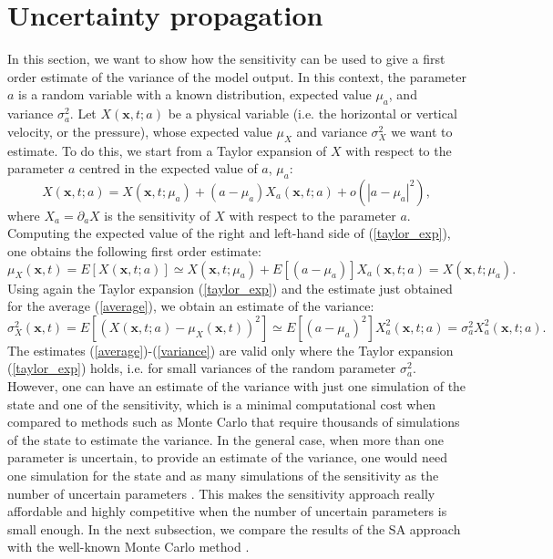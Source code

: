 \chapter{Uncertainty propagation}
\label{sec_uq}
In this section, we want to show how the sensitivity can be used to give a first order estimate of the variance of the model output. In this context, the parameter $a$ is a random variable with a known distribution, expected value $\mu_a$, and variance $\sigma_a^2$. Let $X(\mathbf{x},t;a)$ be a physical variable (i.e. the horizontal or vertical velocity, or the pressure), whose expected value $\mu_X$ and variance $\sigma_X^2$ we want to estimate. To do this, we start from a Taylor expansion of $X$ with respect to the parameter  $a$ centred in the expected value of $a$, $\mu_a$:
\begin{equation}
X(\mathbf{x},t;a) = X(\mathbf{x},t;\mu_a) + (a-\mu_a)X_a(\mathbf{x},t;a) + o(|a-\mu_a|^2),
\label{taylor_exp}
\end{equation}
where $X_a = \partial_a X$ is the sensitivity of $X$ with respect to the parameter $a$. Computing the expected value of the right and left-hand side of (\ref{taylor_exp}), one obtains the following first order estimate:
\begin{equation}
\mu_X(\mathbf{x},t) = E[X(\mathbf{x},t;a)] \simeq X(\mathbf{x},t;\mu_a) + E[(a-\mu_a)]X_a(\mathbf{x},t;a) = X(\mathbf{x},t;\mu_a).
\label{average}
\end{equation}
Using again the Taylor expansion (\ref{taylor_exp}) and the estimate just obtained for the average (\ref{average}), we obtain an estimate of the variance:
\begin{equation}
\sigma_X^2(\mathbf{x},t) = E[(X(\mathbf{x},t;a)-\mu_X(\mathbf{x},t))^2] \simeq E[(a-\mu_a)^2]X_a^2(\mathbf{x},t;a) = \sigma_a^2 X_a^2(\mathbf{x},t;a).
\label{variance}
\end{equation}
The estimates (\ref{average})-(\ref{variance}) are valid only where the Taylor expansion (\ref{taylor_exp}) holds, i.e. for small variances of the random parameter $\sigma_a^2$. However, one can have an estimate of the variance with just one simulation of the state and one of the sensitivity, which is a minimal computational cost when compared to methods such as Monte Carlo that require thousands of simulations of the state to estimate the variance. In the general case, when more than one parameter is uncertain, to provide an estimate of the variance, one would need one simulation for the state and as many simulations of the sensitivity as the number of uncertain parameters \cite{fiorini2018phd}. This makes the sensitivity approach really affordable and highly competitive when the number of uncertain parameters is small enough. In the next subsection, we compare the results of the SA approach with the well-known Monte Carlo method \cite{christian1999monte}.

